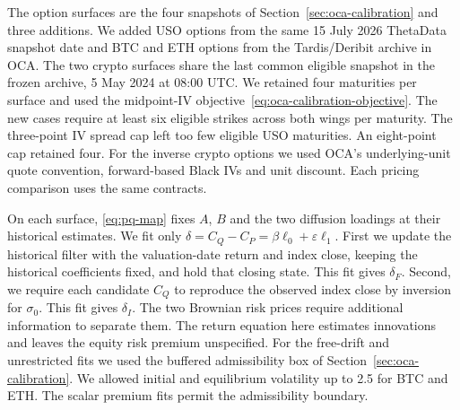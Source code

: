 \documentclass[11pt,a4paper]{article}
\theoremstyle{definition}
\theoremstyle{remark}
\begin{document}
The option surfaces are the four snapshots of Section~\ref{sec:oca-calibration} and three additions.
We added USO options from the same 15 July 2026
ThetaData snapshot date and BTC and ETH options from the Tardis/Deribit archive in OCA.
The two crypto surfaces share the last common eligible snapshot in the frozen archive,
5 May 2024 at 08:00 UTC. We retained four maturities per surface and used the
midpoint-IV objective~\eqref{eq:oca-calibration-objective}. The new cases require
at least six eligible strikes across both wings per maturity. The three-point IV
spread cap left too few eligible USO maturities. An eight-point cap retained four.
For the inverse
crypto options we used OCA's underlying-unit quote convention, forward-based
Black IVs and unit discount. Each pricing comparison uses the same contracts.

On each surface, \eqref{eq:pq-map} fixes $A$, $B$ and the two diffusion loadings at their
historical estimates. We fit only $\delta=C_Q-C_P=\beta\ell_0+\varepsilon\ell_1$.
First we update the historical filter with the valuation-date return and index close, keeping
the historical coefficients fixed, and hold that closing state. This fit gives $\delta_F$.
Second, we require each candidate $C_Q$ to reproduce the observed index close
by inversion for $\sigma_0$. This fit gives $\delta_I$.
The two Brownian risk prices require additional information
to separate them. The return equation here estimates innovations and leaves the
equity risk premium unspecified.
For the free-drift and unrestricted fits we used the buffered admissibility
box of Section~\ref{sec:oca-calibration}. We allowed initial and equilibrium
volatility up to 2.5 for BTC and ETH. The scalar premium fits permit the
admissibility boundary.
\end{document}

